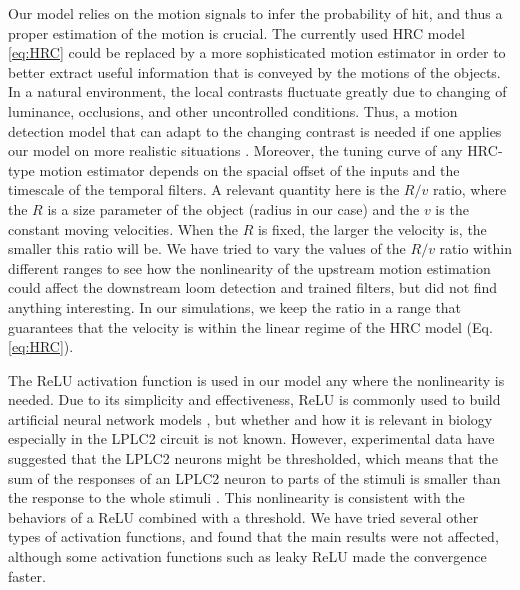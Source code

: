 \documentclass[9pt,lineno]{elife}
\begin{document}
Our model relies on the motion signals to infer the probability of hit, and thus a proper estimation of the motion is crucial. The currently used HRC model \ref{eq:HRC} could be replaced by a more sophisticated motion estimator in order to better extract useful information that is conveyed by the motions of the objects. In a natural environment, the local contrasts fluctuate greatly due to changing of luminance, occlusions, and other uncontrolled conditions. Thus, a motion detection model that can adapt to the changing contrast is needed if one applies our model on more realistic situations \citep{drews2020dynamic}. Moreover, the tuning curve of any HRC-type motion estimator depends on the spacial offset of the inputs and the timescale of the temporal filters. A relevant quantity here is the $R/v$ ratio, where the $R$ is a size parameter of the object (radius in our case) and the $v$ is the constant moving velocities. When the $R$ is fixed, the larger the velocity is, the smaller this ratio will be. We have tried to vary the values of the $R/v$ ratio within different ranges to see how the nonlinearity of the upstream motion estimation could affect the downstream loom detection and trained filters, but did not find anything interesting. In our simulations, we keep the ratio in a range that guarantees that the velocity is within the linear regime of the HRC model (Eq. \ref{eq:HRC}). 


The ReLU activation function is used in our model any where the nonlinearity is needed. Due to its simplicity and effectiveness, ReLU is commonly used to build artificial neural network models \citep{glorot2011deep}, but whether and how it is relevant in biology especially in the LPLC2 circuit is not known. However, experimental data have suggested that the LPLC2 neurons might be thresholded, which means that the sum of the responses of an LPLC2 neuron to parts of the stimuli is smaller than the response to the whole stimuli \citep{klapoetke2017ultra}. This nonlinearity is consistent with the behaviors of a ReLU combined with a threshold. We have tried several other types of activation functions, and found that the main results were not affected, although some activation functions such as leaky ReLU made the convergence faster. 
\end{document}
